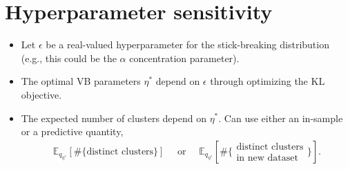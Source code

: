 \documentclass[a0,plainsections,30pt]{sciposter}\usepackage[]{graphicx}\usepackage[]{color}
\newcommand{\Expect}{\mathbb{E}}
\newcommand{\etazopt}{\eta_z^{*}}
\newcommand{\etathetaopt}{\eta_\theta^{*}}
\begin{document}
\begin{minipage}[t]{0.45\textwidth}

% 
% 
% 

\vspace{-0.6in}
\section*{Hyperparameter sensitivity}
\vspace{-0.3in}

\begin{itemize}

\item Let $\epsilon$ be a real-valued hyperparameter for the stick-breaking distribution
(e.g., this could be the $\alpha$ concentration parameter). 

\item The optimal VB parameters $\eta^*$ depend on $\epsilon$ through optimizing the KL objective. 

\item The expected number of clusters depend on $\eta^*$. Can use either an in-sample or a predictive quantity, 
\vspace{-0.1in}
\begin{align}
\Expect_{q_{\eta^*}} \left[ \#\{\text{distinct clusters}\} \right]
\quad \text{ or } \quad 
\Expect_{q_{\eta^*}} 
\left[\#\{\substack{\text{distinct clusters}\\\text{in new dataset}}\} \right].
\end{align}
\end{itemize}


\end{minipage}
\end{document}
